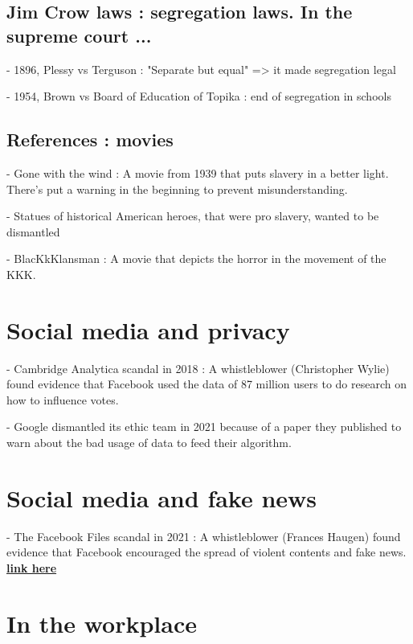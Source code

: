 \documentclass[10pt]{article}
\newcommand\unlien[2]{{\color{color1}\href{#1}{\textbf{#2}}}}
\begin{document}
\subsection*{Jim Crow laws : segregation laws. In the supreme court ...}

- 1896, Plessy vs Terguson : "Separate but equal" => it made segregation legal

- 1954, Brown vs Board of Education of Topika : end of segregation in schools

\subsection*{References : movies}

- Gone with the wind : A movie from 1939 that puts slavery in a better light. 
There's put a warning in the beginning to prevent misunderstanding.

- Statues of historical American heroes, that were pro slavery, wanted to be dismantled

- BlacKkKlansman : A movie that depicts the horror in the movement of the KKK.





\section*{Social media and privacy}

- Cambridge Analytica scandal in 2018 : A whistleblower (Christopher Wylie) 
found evidence that Facebook used the data of 87 million users to do 
research on how to influence votes.

- Google dismantled its ethic team in 2021 because of a paper they published 
to warn about the bad usage of data to feed their algorithm.






\section*{Social media and fake news}

- The Facebook Files scandal in 2021 : A whistleblower (Frances Haugen) found evidence that Facebook encouraged the spread of violent contents and fake news. 
\unlien{https://en.wikipedia.org/wiki/2021_Facebook_leak}{link here}





\section*{In the workplace}
\end{document}
